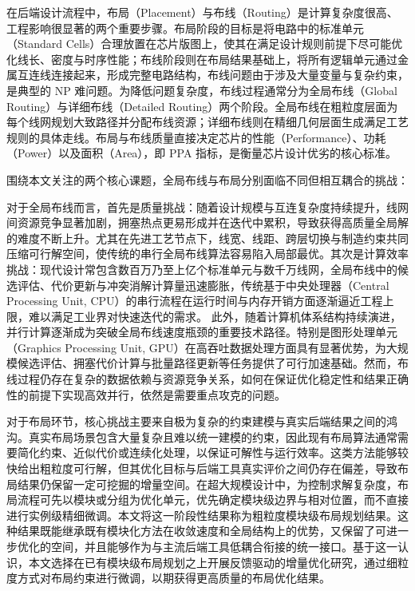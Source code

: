 在后端设计流程中，布局（Placement）与布线（Routing）是计算复杂度很高、工程影响很显著的两个重要步骤。布局阶段的目标是将电路中的标准单元（Standard Cells）合理放置在芯片版图上，使其在满足设计规则前提下尽可能优化线长、密度与时序性能；布线阶段则在布局结果基础上，将所有逻辑单元通过金属互连线连接起来，形成完整电路结构，布线问题由于涉及大量变量与复杂约束，是典型的 NP 难问题。为降低问题复杂度，布线过程通常分为全局布线（Global Routing）与详细布线（Detailed Routing）两个阶段。全局布线在粗粒度层面为每个线网规划大致路径并分配布线资源；详细布线则在精细几何层面生成满足工艺规则的具体走线。布局与布线质量直接决定芯片的性能（Performance）、功耗（Power）以及面积（Area），即 PPA 指标，是衡量芯片设计优劣的核心标准。


围绕本文关注的两个核心课题，全局布线与布局分别面临不同但相互耦合的挑战：

对于全局布线而言，首先是质量挑战：随着设计规模与互连复杂度持续提升，线网间资源竞争显著加剧，拥塞热点更易形成并在迭代中累积，导致获得高质量全局解的难度不断上升。尤其在先进工艺节点下，线宽、线距、跨层切换与制造约束共同压缩可行解空间，使传统的串行全局布线算法容易陷入局部最优。其次是计算效率挑战：现代设计常包含数百万乃至上亿个标准单元与数千万线网，全局布线中的候选评估、代价更新与冲突消解计算量迅速膨胀，传统基于中央处理器（Central Processing Unit, CPU）的串行流程在运行时间与内存开销方面逐渐逼近工程上限，难以满足工业界对快速迭代的需求。
此外，随着计算机体系结构持续演进，并行计算逐渐成为突破全局布线速度瓶颈的重要技术路径。特别是图形处理单元（Graphics Processing Unit, GPU）在高吞吐数据处理方面具有显著优势，为大规模候选评估、拥塞代价计算与批量路径更新等任务提供了可行加速基础。然而，布线过程仍存在复杂的数据依赖与资源竞争关系，如何在保证优化稳定性和结果正确性的前提下实现高效并行，依然是需要重点攻克的问题。

对于布局环节，核心挑战主要来自极为复杂的约束建模与真实后端结果之间的鸿沟。真实布局场景包含大量复杂且难以统一建模的约束，因此现有布局算法通常需要简化约束、近似代价或连续化处理，以保证可解性与运行效率。这类方法能够较快给出粗粒度可行解，但其优化目标与后端工具真实评价之间仍存在偏差，导致布局结果仍保留一定可挖掘的增量空间。在超大规模设计中，为控制求解复杂度，布局流程可先以模块或分组为优化单元，优先确定模块级边界与相对位置，而不直接进行实例级精细微调。本文将这一阶段性结果称为粗粒度模块级布局规划结果。这种结果既能继承既有模块化方法在收敛速度和全局结构上的优势，又保留了可进一步优化的空间，并且能够作为与主流后端工具低耦合衔接的统一接口。基于这一认识，本文选择在已有模块级布局规划之上开展反馈驱动的增量优化研究，通过细粒度方式对布局约束进行微调，以期获得更高质量的布局优化结果。%

